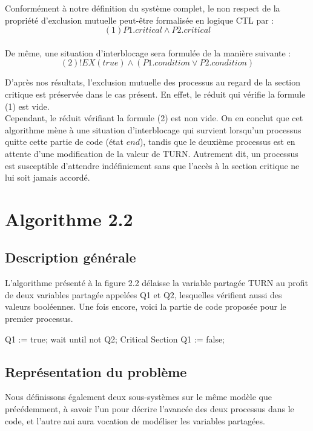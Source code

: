 \documentclass[a4paper]{report}
\begin{document}
Conformément à notre définition du système complet, le non respect de la propriété d'exclusion mutuelle peut-être formalisée
en logique CTL par : \\
$$ (1) P1.critical \land P2.critical$$
\\


De même, une situation d'interblocage sera formulée de la manière suivante : \\
$$ (2) !EX(true) \land ( P1.condition \lor P2.condition )$$

D'après nos résultats, l'exclusion mutuelle des processus au regard de la section critique est préservée dans le cas présent.
En effet, le réduit qui vérifie la formule (1) est vide.
\\
Cependant, le réduit vérifiant la formule (2) est non vide.
On en conclut que cet algorithme mène à une situation d'interblocage qui survient lorsqu'un processus quitte cette partie de code (état $end$), tandis que le deuxième processus
est en attente d'une modification de la valeur de TURN. Autrement dit, un processus est susceptible d'attendre indéfiniement
sans que l'accès à la section critique ne lui soit jamais accordé.

\section{Algorithme 2.2}               %

\subsection{Description générale}         %


L'algorithme présenté à la figure 2.2 délaisse la variable partagée TURN au profit de deux variables partagée appelées Q1 et Q2, lesquelles vérifient aussi des valeurs booléennes. Une fois encore, voici
la partie de code proposée pour le premier processus.

\renewcommand{\verbatimtabsize}{3}
\begin{listing}[1]{1}
Q1 := true;
wait until not Q2;
Critical Section
Q1 := false;
\end{listing}

\subsection{Représentation du problème}         %

Nous définissons également deux sous-systèmes sur le même modèle que précédemment, à savoir l'un pour décrire l'avancée des deux processus dans le code,
et l'autre aui aura vocation de modéliser les variables partagées.
\end{document}
